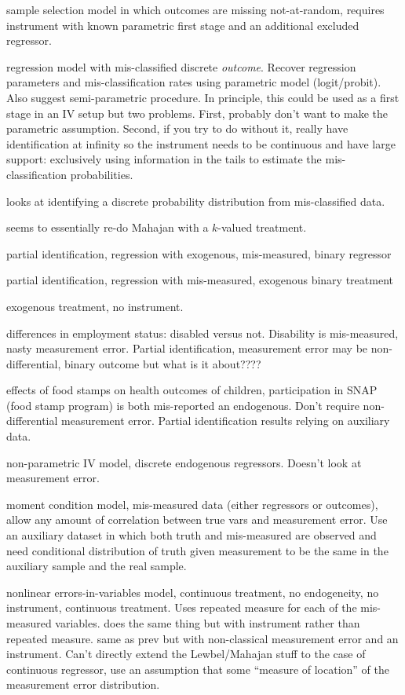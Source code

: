 \cite{shiu2015} sample selection model in which outcomes are missing not-at-random, requires instrument with known parametric first stage and an additional excluded regressor.

\cite{Hausman} regression model with mis-classified discrete \emph{outcome}. Recover regression parameters and mis-classification rates using parametric model (logit/probit). Also suggest semi-parametric procedure.
In principle, this could be used as a first stage in an IV setup but two problems.
First, probably don't want to make the parametric assumption.
Second, if you try to do without it, really have identification at infinity so the instrument needs to be continuous and have large support: exclusively using information in the tails to estimate the mis-classification probabilities.

\cite{molinari} looks at identifying a discrete probability distribution from mis-classified data.

\cite{hu2008} seems to essentially re-do Mahajan with a $k$-valued treatment.

\cite{Bollinger} partial identification, regression with exogenous, mis-measured, binary regressor

\cite{BollingerHasseltWP} partial identification, regression with mis-measured, exogenous binary treatment

\cite{HasseltBollinger} exogenous treatment, no instrument.


\cite{kreider2007} differences in employment status: disabled versus not. Disability is mis-measured, nasty measurement error. Partial identification, measurement error may be non-differential, binary outcome but what is it about????

\cite{kreider2012} effects of food stamps on health outcomes of children, participation in SNAP (food stamp program) is both mis-reported an endogenous.
Don't require non-differential measurement error.
Partial identification results relying on auxiliary data.

\cite{das2005} non-parametric IV model, discrete endogenous regressors. Doesn't look at measurement error.

\cite{ChenHongTamer} moment condition model, mis-measured data (either regressors or outcomes), allow any amount of correlation between true vars and measurement error. Use an auxiliary dataset in which both truth and mis-measured are observed and need conditional distribution of truth given measurement to be the same in the auxiliary sample and the real sample. 

\cite{schennach2004} nonlinear errors-in-variables model, continuous treatment, no endogeneity, no instrument, continuous treatment. Uses repeated measure for each of the mis-measured variables. 
\cite{schennach2007} does the same thing but with instrument rather than repeated measure.
\cite{HuShennach} same as prev but with non-classical measurement error and an instrument. Can't directly extend the Lewbel/Mahajan stuff to the case of continuous regressor, use an assumption that some ``measure of location'' of the measurement error distribution. 

